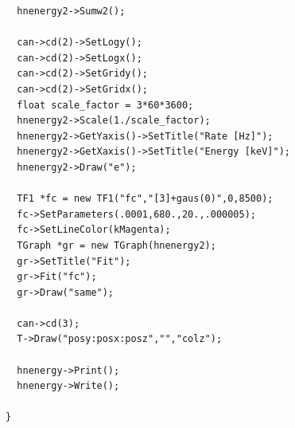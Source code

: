 \documentclass[letterpaper]{article}
\begin{document}
\begin{lstlisting}
  hnenergy2->Sumw2();
  
  can->cd(2)->SetLogy();
  can->cd(2)->SetLogx();
  can->cd(2)->SetGridy();
  can->cd(2)->SetGridx();
  float scale_factor = 3*60*3600;
  hnenergy2->Scale(1./scale_factor);
  hnenergy2->GetYaxis()->SetTitle("Rate [Hz]");
  hnenergy2->GetXaxis()->SetTitle("Energy [keV]");
  hnenergy2->Draw("e");
  
  TF1 *fc = new TF1("fc","[3]+gaus(0)",0,8500);
  fc->SetParameters(.0001,680.,20.,.000005);
  fc->SetLineColor(kMagenta);
  TGraph *gr = new TGraph(hnenergy2);
  gr->SetTitle("Fit");
  gr->Fit("fc");
  gr->Draw("same");
  
  can->cd(3);
  T->Draw("posy:posx:posz","","colz");
  
  hnenergy->Print();
  hnenergy->Write();
  
}
\end{lstlisting}
\newpage
\printbibliography 
\end{document}
